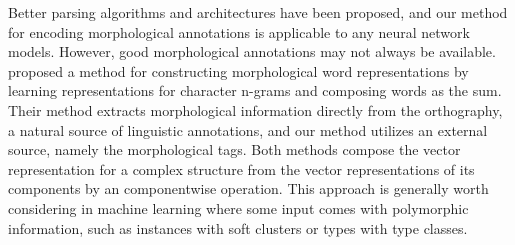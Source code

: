 \documentclass[11pt]{article}
\begin{document}
Better parsing algorithms and architectures have been proposed,
and our method for encoding morphological annotations is applicable to any neural network models.
However, good morphological annotations may not always be available.
\textcite{bojanowski2016enriching} proposed a method for constructing morphological word representations
by learning representations for character n-grams and composing words as the sum.
Their method extracts morphological information directly from the orthography,
a natural source of linguistic annotations,
and our method utilizes an external source, namely the morphological tags.
Both methods compose the vector representation for a complex structure
from the vector representations of its components by an componentwise operation.
This approach is generally worth considering in machine learning where some input comes with polymorphic information,
such as instances with soft clusters or types with type classes.

\printbibliography[]
\end{document}
